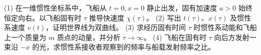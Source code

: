 (1) 在一维惯性坐标系中，飞船从 \(t=0,x=0\) 静止出发，固有加速度 \(a>0\) 始终恒定向右。以飞船固有时 \(\tau\) 推导快速度 \(\chi(\tau)\)。
(2) 写出 \(t(\tau)\)、\(x(\tau)\) 及惯性系速度 \(v(t)\)，证明世界线为双曲线。
(3) 求经历固有时间 \(\tau\) 时惯性系动能和飞船上一个质量为 \(m\) 质点的动量，并分析 \(\tau\to\infty\)。
(4) 飞船在固有时 \(\tau\) 向后方发射一束沿 \(-x\) 的光，求惯性系接收者观察到的频率与船载发射频率之比。
